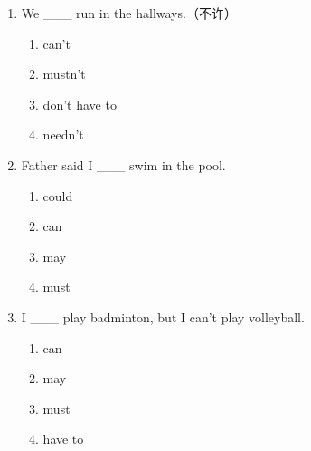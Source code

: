 \documentclass[11pt,a4paper]{ctexart}
\begin{document}
\begin{enumerate}[leftmargin=*,itemsep=4pt]
\begin{enumerate}[label=\Alph*.,leftmargin=2em,itemsep=1pt,topsep=2pt]
\end{enumerate}
\item We \_\_\_ run in the hallways.（不许）
\begin{enumerate}[label=\Alph*.,leftmargin=2em,itemsep=1pt,topsep=2pt]
\item can’t
\item mustn’t
\item don’t have to
\item needn’t
\end{enumerate}
\item Father said I \_\_\_ swim in the pool.
\begin{enumerate}[label=\Alph*.,leftmargin=2em,itemsep=1pt,topsep=2pt]
\item could
\item can
\item may
\item must
\end{enumerate}
\item I \_\_\_ play badminton, but I can’t play volleyball.
\begin{enumerate}[label=\Alph*.,leftmargin=2em,itemsep=1pt,topsep=2pt]
\item can
\item may
\item must
\item have to
\end{enumerate}
\end{enumerate}
\end{document}
